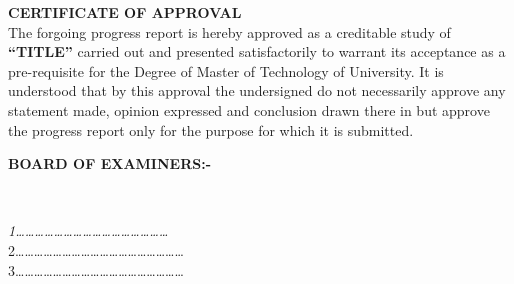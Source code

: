 \centering \textbf{CERTIFICATE OF APPROVAL}\\
\justify
The forgoing progress report is hereby approved as a creditable study of \textbf{“TITLE”} carried out and presented satisfactorily to warrant its acceptance as a pre-requisite for the Degree of Master of Technology of University. It is understood that by this approval the undersigned do not necessarily approve any statement made, opinion expressed and conclusion drawn there in but approve the progress report only for the purpose for which it is submitted.\\[5cm]
\justify


\begin{flushleft}
\textbf{BOARD OF EXAMINERS:-}\\[1cm]
\end{flushleft}

~
\begin{minipage}{0.45\textwidth}
\begin{flushright} \large
\emph{1…………………………………………}\\
2………………………………………………\\
3………………………………………………\\
\end{flushright}
\end{minipage}

\newpage